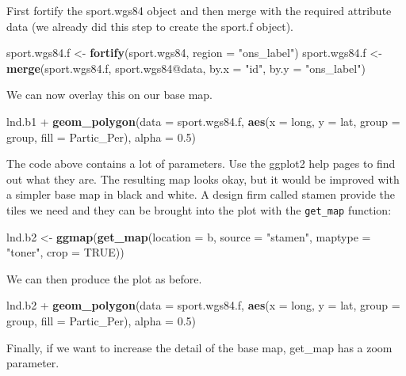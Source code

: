 \documentclass[]{article}
\newenvironment{Shaded}{}{}
\newcommand{\KeywordTok}[1]{\textcolor[rgb]{0.00,0.44,0.13}{\textbf{{#1}}}}
\newcommand{\DataTypeTok}[1]{\textcolor[rgb]{0.56,0.13,0.00}{{#1}}}
\newcommand{\FloatTok}[1]{\textcolor[rgb]{0.25,0.63,0.44}{{#1}}}
\newcommand{\StringTok}[1]{\textcolor[rgb]{0.25,0.44,0.63}{{#1}}}
\newcommand{\OtherTok}[1]{\textcolor[rgb]{0.00,0.44,0.13}{{#1}}}
\newcommand{\NormalTok}[1]{{#1}}
\begin{document}
First fortify the sport.wgs84 object and then merge with the required
attribute data (we already did this step to create the sport.f object).

\begin{Shaded}
\begin{Highlighting}[]
\NormalTok{sport.wgs84.f <- }\KeywordTok{fortify}\NormalTok{(sport.wgs84, }\DataTypeTok{region =} \StringTok{"ons_label"}\NormalTok{)}
\NormalTok{sport.wgs84.f <- }\KeywordTok{merge}\NormalTok{(sport.wgs84.f, sport.wgs84@data, }\DataTypeTok{by.x =} \StringTok{"id"}\NormalTok{, }\DataTypeTok{by.y =} \StringTok{"ons_label"}\NormalTok{)}
\end{Highlighting}
\end{Shaded}
We can now overlay this on our base map.

\begin{Shaded}
\begin{Highlighting}[]
\NormalTok{lnd.b1 + }\KeywordTok{geom_polygon}\NormalTok{(}\DataTypeTok{data =} \NormalTok{sport.wgs84.f, }\KeywordTok{aes}\NormalTok{(}\DataTypeTok{x =} \NormalTok{long, }\DataTypeTok{y =} \NormalTok{lat, }\DataTypeTok{group =} \NormalTok{group, }
    \DataTypeTok{fill =} \NormalTok{Partic_Per), }\DataTypeTok{alpha =} \FloatTok{0.5}\NormalTok{)}
\end{Highlighting}
\end{Shaded}
The code above contains a lot of parameters. Use the ggplot2 help pages
to find out what they are. The resulting map looks okay, but it would be
improved with a simpler base map in black and white. A design firm
called stamen provide the tiles we need and they can be brought into the
plot with the \texttt{get\_map} function:

\begin{Shaded}
\begin{Highlighting}[]
\NormalTok{lnd.b2 <- }\KeywordTok{ggmap}\NormalTok{(}\KeywordTok{get_map}\NormalTok{(}\DataTypeTok{location =} \NormalTok{b, }\DataTypeTok{source =} \StringTok{"stamen"}\NormalTok{, }\DataTypeTok{maptype =} \StringTok{"toner"}\NormalTok{, }
    \DataTypeTok{crop =} \OtherTok{TRUE}\NormalTok{))}
\end{Highlighting}
\end{Shaded}
We can then produce the plot as before.

\begin{Shaded}
\begin{Highlighting}[]
\NormalTok{lnd.b2 + }\KeywordTok{geom_polygon}\NormalTok{(}\DataTypeTok{data =} \NormalTok{sport.wgs84.f, }\KeywordTok{aes}\NormalTok{(}\DataTypeTok{x =} \NormalTok{long, }\DataTypeTok{y =} \NormalTok{lat, }\DataTypeTok{group =} \NormalTok{group, }
    \DataTypeTok{fill =} \NormalTok{Partic_Per), }\DataTypeTok{alpha =} \FloatTok{0.5}\NormalTok{)}
\end{Highlighting}
\end{Shaded}
Finally, if we want to increase the detail of the base map, get\_map has
a zoom parameter.
\end{document}
